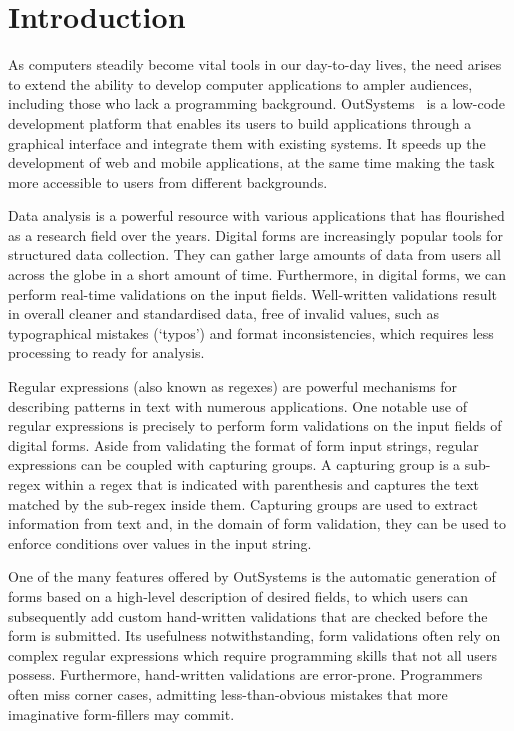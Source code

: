 \chapter{Introduction}

As computers steadily become vital tools in our day-to-day lives, the need arises to extend the ability to develop computer applications to ampler audiences, including those who lack a programming background.
OutSystems~\cite{outsystems-website} is a low-code development platform that enables its users to build applications through a graphical interface and integrate them with existing systems. It speeds up the development of web and mobile applications, at the same time making the task more accessible to users from different backgrounds.

Data analysis is a powerful resource with various applications that has flourished as a research field over the years.
Digital forms are increasingly popular tools for structured data collection. They can gather large amounts of data from users all across the globe in a short amount of time. Furthermore, in digital forms, we can perform real-time validations on the input fields.
Well-written validations result in overall cleaner and standardised data, free of invalid values, such as typographical mistakes (`typos') and format inconsistencies, which requires less processing to ready for analysis.

Regular expressions (also known as regexes) are powerful mechanisms for describing patterns in text with numerous applications.
One notable use of regular expressions is precisely to perform form validations on the input fields of digital forms.
%
Aside from validating the format of form input strings, regular expressions can be coupled with capturing groups.
%
A capturing group is a sub-regex within a regex that is indicated with parenthesis and 
captures the text matched by the sub-regex inside them.
Capturing groups are used to extract information from text and, in the domain of form validation, they can be used to enforce conditions over values in the input string.

One of the many features offered by OutSystems is the automatic generation of forms based on a high-level description of desired fields, to which users can subsequently add custom hand-written validations that are checked before the form is submitted.
%
Its usefulness notwithstanding, form validations often rely on complex regular expressions which require programming skills that not all users possess.
Furthermore, hand-written validations are error-prone. Programmers often miss corner cases, admitting less-than-obvious mistakes that more imaginative form-fillers may commit.


